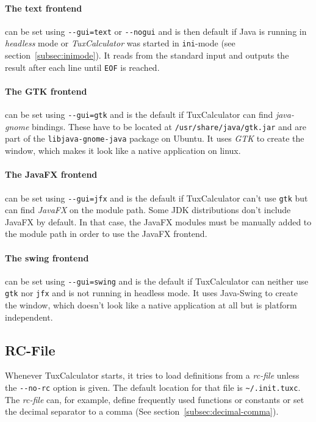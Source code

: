 \documentclass[10pt]{article}
\let\~=\allowbreak
\begin{document}
    \paragraph{The text frontend} can be set using \verb|--gui=text| or \verb|--nogui| and is then default if Java is running in \textsl{headless} mode or \textit{TuxCalculator} was started in \verb|ini|-mode (see section~\ref{subsec:inimode}).
    It reads from the standard input and outputs the result after each line until \verb|EOF| is reached.
    
    \paragraph{The GTK frontend} can be set using \verb|--gui=gtk| and is the default if TuxCalculator can find \textsl{java-gnome} bindings.
    These have to be located at \texttt{/usr\~/share\~/java\~/gtk.jar} and are part of the \texttt{libjava-\~gnome-\~java} package on Ubuntu.
    It uses \textsl{GTK} to create the window, which makes it look like a native application on linux.
    
    \paragraph{The JavaFX frontend} can be set using \verb|--gui=jfx| and is the default if TuxCalculator can't use \verb|gtk| but can find \textsl{JavaFX} on the module path.
    Some JDK distributions don't include JavaFX by default.
    In that case, the JavaFX modules must be manually added to the module path in order to use the JavaFX frontend.
    
    \paragraph{The swing frontend} can be set using \verb|--gui=swing| and is the default if TuxCalculator can neither use \verb|gtk| nor \verb|jfx| and is not running in headless mode.
    It uses Java-Swing to create the window, which doesn't look like a native application at all but is platform independent.
    
    \subsection{RC-File}\label{subsec:rcfile}
    Whenever TuxCalculator starts, it tries to load definitions from a \textit{rc-file} unless the \verb|--no-rc| option is given.
    The default location for that file is \verb|~/.init.tuxc|.
    The \textit{rc-file} can, for example, define frequently used functions or constants or set the decimal separator to a comma (See section~\ref{subsec:decimal-comma}).
\end{document}
